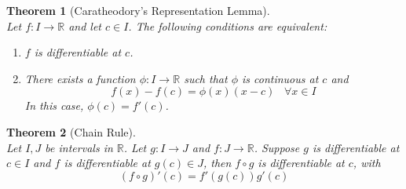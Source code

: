 \documentclass[12pt]{article}
\newtheorem{theorem}{Theorem}[section]
\theoremstyle{definition}
\begin{document}
\begin{theorem}[Caratheodory's Representation Lemma]
\hfill\\\normalfont Let $f:I\to\mathbb{R}$ and let $c\in I$. The following conditions are equivalent:
\begin{enumerate}
	\item $f$ is differentiable at $c$.
	\item There exists a function $\phi:I\to\mathbb{R}$ such that $\phi$ is continuous at $c$ and
	\[
f(x)-f(c)=\phi(x)(x-c)\;\;\;\forall x\in I
	\]
	In this case, $\phi(c) = f'(c)$.
\end{enumerate}
\end{theorem}
\begin{theorem}[Chain Rule]
\hfill\\\normalfont Let $I,J$ be intervals in $\mathbb{R}$. Let $g:I\to J$ and $f:J\to \mathbb{R}$. Suppose $g$ is differentiable at $c\in I$ and $f$ is differentiable at $g(c)\in J$, then $f\circ g$ is differentiable at $c$, with
\[
(f\circ g)'(c)=f'(g(c))g'(c)
\]
\end{theorem}
\end{document}
